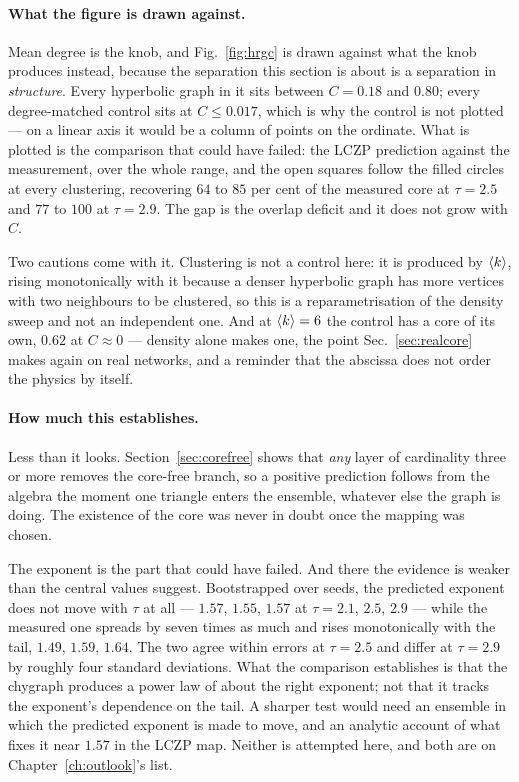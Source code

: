 \paragraph{What the figure is drawn against.} Mean degree is the knob, and
Fig.~\ref{fig:hrgc} is drawn against what the knob produces instead, because
the separation this section is about is a separation in \emph{structure}. Every
hyperbolic graph in it sits between $C=0.18$ and $0.80$; every degree-matched
control sits at $C\le0.017$, which is why the control is not plotted --- on a
linear axis it would be a column of points on the ordinate.
What is plotted is the comparison that could have failed: the LCZP prediction
against the measurement, over the whole range, and the open squares follow the
filled circles at every clustering, recovering $64$ to $85$ per cent of the
measured core at $\tau=2.5$ and $77$ to $100$ at $\tau=2.9$. The gap is the
overlap deficit and it does not grow with $C$.

Two cautions come with it. Clustering is not a control here: it is produced by
$\langle k \rangle$, rising monotonically with it because a denser hyperbolic graph has
more vertices with two neighbours to be clustered, so this is a
reparametrisation of the density sweep and not an independent one. And at
$\langle k \rangle=6$ the control has a core of its own, $0.62$ at $C\approx0$ --- density
alone makes one, the point Sec.~\ref{sec:realcore} makes again on real
networks, and a reminder that the abscissa does not order the physics by
itself.

\paragraph{How much this establishes.} Less than it looks.
Section~\ref{sec:corefree} shows that \emph{any} layer of
cardinality three or more removes the core-free branch, so a positive prediction
follows from the algebra the moment one triangle enters the ensemble, whatever
else the graph is doing. The existence of the core was never in doubt once the
mapping was chosen.

The exponent is the part that could have failed. And there the evidence is
weaker than the central values suggest. Bootstrapped over seeds, the predicted
exponent does not move with $\tau$ at all --- $1.57$, $1.55$, $1.57$ at
$\tau=2.1$, $2.5$, $2.9$ --- while the measured one spreads by seven times as
much and rises monotonically with the tail, $1.49$, $1.59$, $1.64$. The two
agree within errors at $\tau=2.5$ and differ at $\tau=2.9$ by roughly four standard
deviations. What the comparison establishes is that the chygraph produces a
power law of about the right exponent; not that it tracks the exponent's
dependence on the tail. A sharper test would need an ensemble in which the
predicted exponent is made to move, and an analytic account of what fixes it
near $1.57$ in the LCZP map. Neither is attempted here, and both are on
Chapter~\ref{ch:outlook}'s list.

